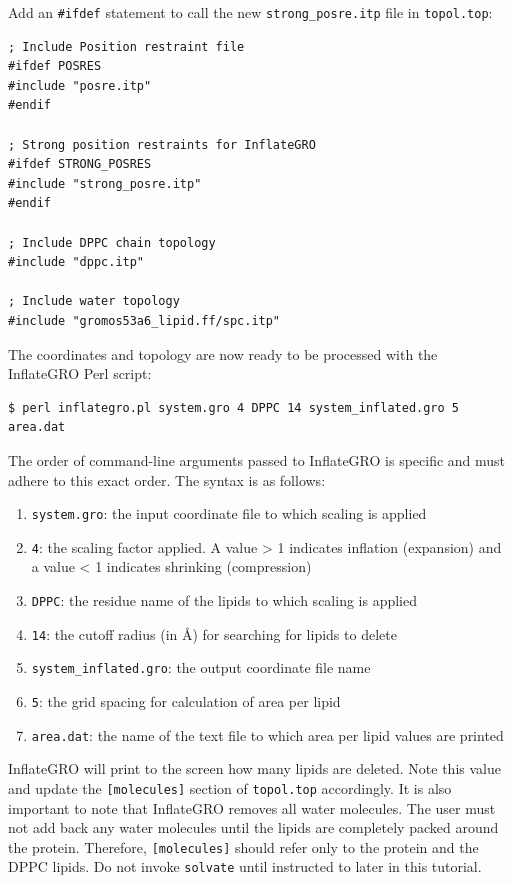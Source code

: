 \documentclass[9pt,tutorial,pubversion]{livecoms}
\begin{document}
Add an \texttt{\#ifdef} statement to call the new \texttt{strong\_posre.itp} file in \texttt{topol.top}:

\begin{lstlisting}
; Include Position restraint file
#ifdef POSRES
#include "posre.itp"
#endif

; Strong position restraints for InflateGRO
#ifdef STRONG_POSRES
#include "strong_posre.itp"
#endif

; Include DPPC chain topology
#include "dppc.itp"

; Include water topology
#include "gromos53a6_lipid.ff/spc.itp"
\end{lstlisting}

The coordinates and topology are now ready to be processed with the InflateGRO Perl script:

\begin{lstlisting}
$ perl inflategro.pl system.gro 4 DPPC 14 system_inflated.gro 5 area.dat
\end{lstlisting}
%
The order of command-line arguments passed to InflateGRO is specific and must adhere to this exact order. The syntax is as follows:

\begin{enumerate}
	\item{\texttt{system.gro}: the input coordinate file to which scaling is applied}
	\item{\texttt{4}: the scaling factor applied. A value > 1 indicates inflation (expansion) and a value < 1 indicates shrinking (compression)}
	\item{\texttt{DPPC}: the residue name of the lipids to which scaling is applied}
	\item{\texttt{14}: the cutoff radius (in \AA) for searching for lipids to delete}
	\item{\texttt{system\_inflated.gro}: the output coordinate file name}
	\item{\texttt{5}: the grid spacing for calculation of area per lipid}
	\item{\texttt{area.dat}: the name of the text file to which area per lipid values are printed}
\end{enumerate}

InflateGRO will print to the screen how many lipids are deleted. Note this value and update the \texttt{[molecules]} section of \texttt{topol.top} accordingly. It is also important to note that InflateGRO removes all water molecules. The user must not add back any water molecules until the lipids are completely packed around the protein. Therefore, \texttt{[molecules]} should refer only to the protein and the DPPC lipids. Do not invoke \texttt{solvate} until instructed to later in this tutorial.
\end{document}
